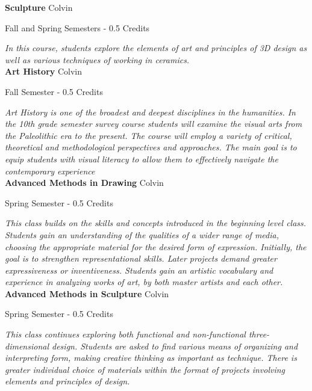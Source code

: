 \noindent\textbf{Sculpture} \hfill Colvin

\noindent Fall and Spring Semesters - 0.5 Credits

\vspace{1mm}\emph{In this course, students explore the elements of art and principles of 3D design as well as various techniques of working in ceramics.}\\


\noindent\textbf{Art History} \hfill Colvin

\noindent Fall Semester - 0.5 Credits

\vspace{1mm}\emph{Art History is one of the broadest and deepest disciplines in the humanities. In the 10th grade semester survey course students will examine the visual arts from the Paleolithic era to the present. The course will employ a variety of critical, theoretical and methodological perspectives and approaches. The main goal is to equip students with visual literacy to allow them to effectively navigate the contemporary experience}\\


\noindent\textbf{Advanced Methods in Drawing} \hfill Colvin

\noindent Spring Semester - 0.5 Credits

\vspace{1mm}\emph{This class builds on the skills and concepts introduced in the beginning level class. Students gain an understanding of the qualities of a wider range of media, choosing the appropriate material for the desired form of expression. Initially, the goal is to strengthen representational skills. Later projects demand greater expressiveness or inventiveness. Students gain an artistic vocabulary and experience in analyzing works of art, by both master artists and each other.}\\


\noindent\textbf{Advanced Methods in Sculpture} \hfill Colvin

\noindent Spring Semester - 0.5 Credits

\vspace{1mm}\emph{This class continues exploring both functional and non-functional three-dimensional design. Students are asked to find various means of organizing and interpreting form, making creative thinking as important as technique. There is greater individual choice of materials within the format of projects involving elements and principles of design.}\\


